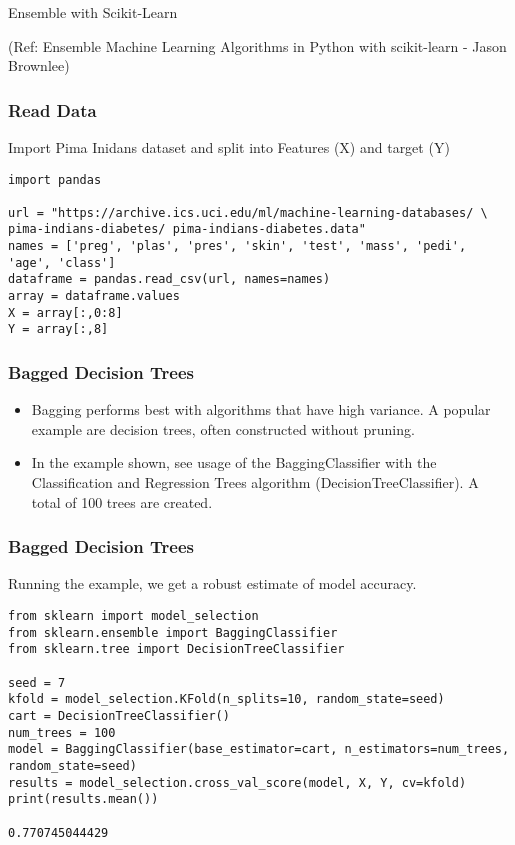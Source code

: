 \begin{frame}[fragile]\frametitle{}
\begin{center}
{\Large Ensemble with Scikit-Learn}

{\tiny (Ref: Ensemble Machine Learning Algorithms in Python with scikit-learn - Jason Brownlee)}
\end{center}
\end{frame}

\begin{frame}[fragile]\frametitle{Read Data}
Import Pima Inidans dataset and split into Features (X) and target (Y)
\begin{lstlisting}
import pandas

url = "https://archive.ics.uci.edu/ml/machine-learning-databases/ \
pima-indians-diabetes/ pima-indians-diabetes.data"
names = ['preg', 'plas', 'pres', 'skin', 'test', 'mass', 'pedi', 'age', 'class']
dataframe = pandas.read_csv(url, names=names)
array = dataframe.values
X = array[:,0:8]
Y = array[:,8]
\end{lstlisting}
\end{frame}

\begin{frame}[fragile]\frametitle{Bagged Decision Trees}

	\begin{itemize}
	\item Bagging performs best with algorithms that have high variance. A popular example are decision trees, often constructed without pruning.
	\item In the example shown, see usage of the BaggingClassifier with the Classification and Regression Trees algorithm (DecisionTreeClassifier). A total of 100 trees are created.
	\end{itemize}
	
\end{frame}

\begin{frame}[fragile]\frametitle{Bagged Decision Trees}
Running the example, we get a robust estimate of model accuracy.

\begin{lstlisting}
from sklearn import model_selection
from sklearn.ensemble import BaggingClassifier
from sklearn.tree import DecisionTreeClassifier

seed = 7
kfold = model_selection.KFold(n_splits=10, random_state=seed)
cart = DecisionTreeClassifier()
num_trees = 100
model = BaggingClassifier(base_estimator=cart, n_estimators=num_trees, random_state=seed)
results = model_selection.cross_val_score(model, X, Y, cv=kfold)
print(results.mean())

0.770745044429
\end{lstlisting}
\end{frame}



